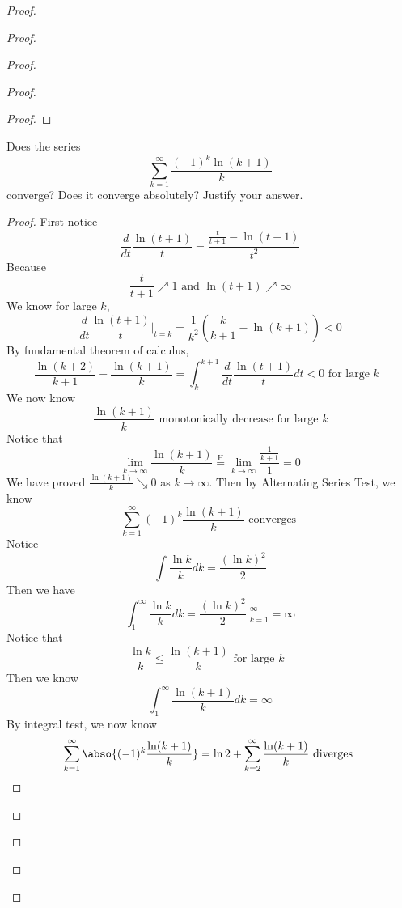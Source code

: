 \documentclass{report}
\begin{document}
\begin{proof}
\begin{proof}
\begin{proof}
\begin{proof}
\begin{proof}
\end{proof}

\begin{question}{}{}
Does the series
\[
\sum_{k=1}^{\infty} \frac{(-1)^k \ln(k + 1)}{k}
\]
converge? Does it converge absolutely? Justify your answer.
\end{question}
\begin{proof}
First notice
\begin{equation}
\frac{d}{dt}\frac{\ln (t+1)}{t} =\frac{\frac{t}{t+1}- \ln (t+1)}{t^2}
\end{equation}
Because 
\begin{equation}
\frac{t}{t+1}\nearrow 1 \text{ and }\ln (t+1)\nearrow \infty
\end{equation}
We know for large $k$, 
\begin{equation}
\frac{d}{dt}\frac{\ln (t+1)}{t} \bigg|_{t=k} =\frac{1}{k^2}(\frac{k}{k+1}-\ln (k+1))<0
\end{equation}
By fundamental theorem of calculus, 
\begin{equation}
\frac{\ln (k+2)}{k+1}-\frac{\ln (k+1)}{k}=\int_{k}^{k+1} \frac{d}{dt} \frac{\ln (t+1)}{t}dt<0\text{ for large $k$ }
\end{equation}
We now know 
\begin{equation}
\frac{\ln (k+1)}{k}\text{ monotonically decrease for large $k$}
\end{equation}
Notice that 
\begin{equation}
\lim_{k\to\infty} \frac{\ln (k+1)}{k}\stackrel{\mathrm{H}}{=}\lim_{k\to\infty} \frac{\frac{1}{k+1}}{1}=0
\end{equation}
We have proved $\frac{\ln (k+1)}{k}\searrow 0$ as $k\to\infty$. Then by Alternating Series Test, we know 
\begin{equation}
\sum_{k=1}^\infty (-1)^k \frac{\ln (k+1)}{k}\text{ converges }
\end{equation}
Notice 
\begin{equation}
\int \frac{\ln k}{k}dk=\frac{(\ln k)^2}{2}
\end{equation}
Then we have
\begin{equation}
\int_{1}^\infty \frac{\ln k}{k}dk= \frac{(\ln k)^2}{2}\bigg|_{k=1}^\infty =\infty 
\end{equation}
Notice that 
\begin{equation}
\frac{\ln k}{k}\leq \frac{\ln (k+1)}{k}\text{ for large $k$ }
\end{equation}
Then we know
\begin{equation}
\int_1^\infty \frac{\ln (k+1)}{k}dk =\infty
\end{equation}
By integral test, we now know 
\begin{equation}
\sum_{k=1}^\infty \abso{(-1)^k \frac{\ln (k+1)}{k}}=\ln 2+\sum_{k=2}^\infty \frac{\ln (k+1)}{k}\text{ diverges }
\end{equation}



\end{proof}
\end{proof}
\end{proof}
\end{proof}
\end{proof}
\end{document}
